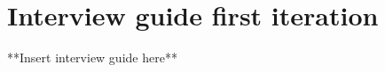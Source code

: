 \documentclass[../Main/thesis.tex]{subfiles}
\begin{document}
\chapter{Interview guide first iteration}
\label{app:interview-guide-first}
**Insert interview guide here**
\end{document}
